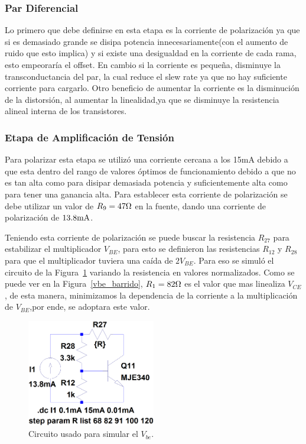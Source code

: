 \subsubsection*{Par Diferencial}

Lo primero que debe definirse en esta etapa es la corriente de polarización ya que si es demasiado grande se disipa potencia innecesariamente(con el aumento de ruido que esto implica) y si existe una desigualdad en la corriente de cada rama, esto empeoraría el offset. En cambio si la corriente es pequeña, disminuye la transconductancia del par, la cual reduce el slew rate ya que no hay suficiente corriente para cargarlo. Otro beneficio de aumentar la corriente es la disminución de la distorsión, al aumentar la linealidad,ya que se disminuye la resistencia alineal interna de los transistores.


\medskip
\subsubsection*{Etapa de Amplificación de Tensión}
Para polarizar esta etapa se utilizó una corriente cercana a los 15mA debido a que esta dentro del rango de valores óptimos de funcionamiento debido a que no es tan alta como para disipar demasiada potencia y suficientemente alta como para tener una ganancia alta. Para establecer esta corriente de polarización se debe utilizar un valor de $R_9 = 47\ohm$ en la fuente, dando una corriente de polarización de $13.8\mamper$. 

Teniendo esta corriente de polarización se puede buscar la resistencia $R_{27}$
para estabilizar el multiplicador $V_{BE}$, para esto se definieron las resistencias $R_{12}$ y $R_{28}$ para que el multiplicador tuviera una caída de $2V_{BE}$. Para eso se simuló el circuito de la Figura~\ref{vbe_barrido_cir} variando la resistencia en valores normalizados. Como se puede ver en la Figura~\ref{vbe_barrido}, $R_1=82\ohm$ es el valor que mas linealiza $V_{CE}$, de esta manera, minimizamos la dependencia de la corriente a la multiplicación de $V_{BE}$,por ende, se adoptara este valor.

\begin{figure}[H]
\centering
\includegraphics[width=0.5\textwidth]{img/circ_barrido.png}
\caption{Circuito usado para simular el $V_{be}$.}
\label{vbe_barrido_cir} 
\end{figure}

